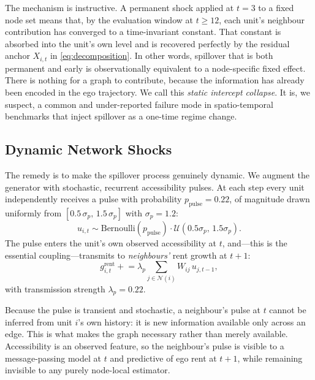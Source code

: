 The mechanism is instructive. A permanent shock applied at $t = 3$ to a fixed
node set means that, by the evaluation window at $t \geq 12$, each unit's
neighbour contribution has converged to a time-invariant constant. That
constant is absorbed into the unit's own level and is recovered perfectly by
the residual anchor $X_{i,t}$ in \eqref{eq:decomposition}. In other words,
spillover that is both permanent and early is observationally equivalent to a
node-specific fixed effect. There is nothing for a graph to contribute, because
the information has already been encoded in the ego trajectory. We call this
\emph{static intercept collapse}. It is, we suspect, a common and under-reported
failure mode in spatio-temporal benchmarks that inject spillover as a one-time
regime change.

\subsection{Dynamic Network Shocks}

The remedy is to make the spillover process genuinely dynamic. We augment the
generator with stochastic, recurrent accessibility pulses. At each step every
unit independently receives a pulse with probability $p_{\mathrm{pulse}} =
0.22$, of magnitude drawn uniformly from $[0.5\,\sigma_p,\, 1.5\,\sigma_p]$
with $\sigma_p = 1.2$:
\begin{equation}
  u_{i,t} \sim \mathrm{Bernoulli}(p_{\mathrm{pulse}}) \cdot
                \mathcal{U}(0.5\sigma_p,\, 1.5\sigma_p).
  \label{eq:pulse}
\end{equation}
The pulse enters the unit's own observed accessibility at $t$, and---this is
the essential coupling---transmits to \emph{neighbours'} rent growth at $t+1$:
\begin{equation}
  g^{\mathrm{rent}}_{i,t} \mathrel{+}= \lambda_p \sum_{j \in \mathcal{N}(i)}
  W_{ij} \, u_{j,t-1},
  \label{eq:pulse-transmission}
\end{equation}
with transmission strength $\lambda_p = 0.22$.

Because the pulse is transient and stochastic, a neighbour's pulse at $t$
cannot be inferred from unit $i$'s own history: it is new information available
only across an edge. This is what makes the graph necessary rather than merely
available. Accessibility is an observed feature, so the neighbour's pulse is
visible to a message-passing model at $t$ and predictive of ego rent at $t+1$,
while remaining invisible to any purely node-local estimator.


